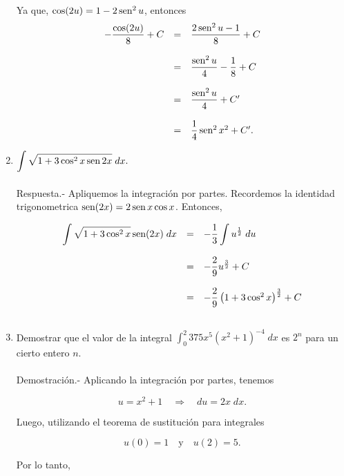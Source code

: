 \begin{enumerate}[\bfseries 1.]
	Ya que, $\cos(2u)=1-2\mathop{\mbox{\normalfont sen}}\nolimits^2 u$, entonces
	$$
	\begin{array}{rcl}
	    -\dfrac{\cos(2u)}{8}+C &=& \dfrac{2\mathop{\mbox{\normalfont sen}}\nolimits^2u-1}{8}+C\\\\
				   &=& \dfrac{\mathop{\mbox{\normalfont sen}}\nolimits^2u}{4}-\dfrac{1}{8}+C\\\\
				   &=& \dfrac{\mathop{\mbox{\normalfont sen}}\nolimits^2u}{4}+C'\\\\
				   &=& \dfrac{1}{4}\mathop{\mbox{\normalfont sen}}\nolimits^2x^2+C'.
	\end{array}
	$$
	\vspace{.5cm}


    \item $\displaystyle\int \sqrt{1+3\cos^2 x \mathop{\mbox{\normalfont sen}}\nolimits 2x}\; dx.$\\\\
	Respuesta.-\; Apliquemos la integración por partes. Recordemos la identidad trigonometrica $\mathop{\mbox{\normalfont sen}}\nolimits(2x)=2\mathop{\mbox{\normalfont sen}}\nolimits x\cos x$. Entonces,

	$$
	\begin{array}{rcl}
	    \displaystyle\int \sqrt{1+3\cos^2 x}\mathop{\mbox{\normalfont sen}}\nolimits(2x)\; dx &=& -\dfrac{1}{3}\displaystyle\int u^{\frac{1}{2}}\; du\\\\
							      &=& -\dfrac{2}{9}u^{\frac{3}{2}} + C \\\\
							      &=& -\dfrac{2}{9}\left(1+3\cos^2 x\right)^{\frac{3}{2}}+C\\\\
	\end{array}
	$$
	\vspace{.5cm}

    \item Demostrar que el valor de la integral $\displaystyle\int_0^2 375x^5\left(x^2+1\right)^{-4}\; dx$ es $2^n$ para un cierto entero $n$.\\\\
	Demostración.-\; Aplicando la integración por partes, tenemos

	$$u=x^2+1\quad \Rightarrow \quad du=2x\; dx.$$

	Luego, utilizando el teorema de sustitución para integrales

	$$u(0)=1\quad \mbox{y}\quad u(2)=5.$$

	Por lo tanto,


\end{enumerate}
